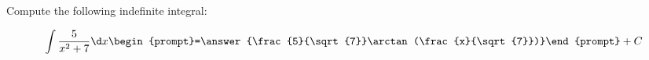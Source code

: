 \documentclass{ximera}
\author{Jim Talamo}
\begin{document}
\begin{exercise}
Compute the following indefinite integral:

\[
\int \frac{5}{x^2+7} \d x 
\begin{prompt}=\answer{\frac{5}{\sqrt{7}}\arctan(\frac{x}{\sqrt{7}})}\end{prompt}+C
\]
\end{exercise}
\end{document}
